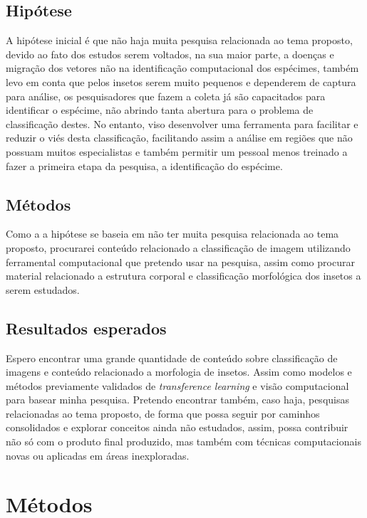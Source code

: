 \documentclass[conference]{IEEEtran}
\begin{document}
\subsection{Hipótese}
A hipótese inicial é que não haja muita pesquisa relacionada ao tema proposto, devido ao fato dos estudos serem voltados, na sua maior parte, a doenças e migração dos vetores não na identificação computacional dos espécimes, também levo em conta que pelos insetos serem muito pequenos e dependerem de captura para análise, os pesquisadores que fazem a coleta já são capacitados para identificar o espécime, não abrindo tanta abertura para o problema de classificação destes. No entanto, viso desenvolver uma ferramenta para facilitar e reduzir o viés desta classificação, facilitando assim a análise em regiões que não possuam muitos especialistas e também permitir um pessoal menos treinado a fazer a primeira etapa da pesquisa, a identificação do espécime.

\subsection{Métodos}
Como a a hipótese se baseia em não ter muita pesquisa relacionada ao tema proposto,  procurarei conteúdo relacionado a classificação de imagem utilizando ferramental computacional que pretendo usar na pesquisa, assim como procurar material relacionado a estrutura corporal e classificação morfológica dos insetos a serem estudados.

\subsection{Resultados esperados}
Espero encontrar uma grande quantidade de conteúdo sobre classificação de imagens e conteúdo relacionado a morfologia de insetos. Assim como modelos e métodos previamente validados de \emph{transference learning} e visão computacional para basear minha pesquisa. 
Pretendo encontrar também, caso haja, pesquisas relacionadas ao tema proposto, de forma que possa seguir por caminhos consolidados e explorar conceitos ainda não estudados, assim, possa contribuir não só com o produto final produzido, mas também com técnicas computacionais novas ou aplicadas em áreas inexploradas.

\section{Métodos}
\end{document}
